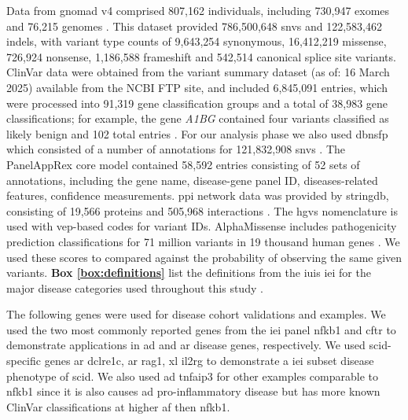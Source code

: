 Data from \ac{gnomad} v4 comprised 807,162 individuals, including 730,947 exomes and 76,215 genomes \cite{karczewski2020mutational}. This dataset provided 786,500,648 \ac{snv}s and 122,583,462 \ac{indel}s, with variant type counts of 9,643,254 synonymous, 16,412,219 missense, 726,924 nonsense, 1,186,588 frameshift and 542,514 canonical splice site variants. ClinVar data were obtained from the variant summary dataset (as of: 16 March 2025) available from the NCBI FTP site, and included 6,845,091 entries, which were processed into 91,319 gene classification groups and a total of 38,983 gene classifications; for example, the gene \textit{A1BG} contained four variants classified as likely benign and 102 total entries \cite{landrum_clinvar_2018}. For our analysis phase we also used \ac{dbnsfp} which consisted of a number of annotations for 121,832,908 \ac{snv}s 
\cite{liu_dbnsfp_2020}. 
The PanelAppRex core model contained 58,592 entries consisting of 52 sets of annotations, including the gene name, disease-gene panel ID, diseases-related features, confidence measurements.
\cite{lawless_panelapprex_2025}
\ac{ppi} network data was provided by \ac{stringdb}, consisting of 19,566 proteins and 505,968 interactions \cite{szklarczyk2025string}.
The \ac{hgvs} nomenclature is used with \ac{vep}-based codes for variant IDs.
AlphaMissense includes pathogenicity prediction classifications for 71 million variants in 19 thousand human genes \cite{cheng_accurate_2023, jun_cheng_2023_8208688}. We used these scores to compared against the probability of observing the same given variants.
\textbf{Box \ref{box:definitions}} list the definitions from the \ac{iuis} \ac{iei} for the major disease categories used throughout this study \cite{poli_human_2025}.

The following genes were used for disease cohort validations and examples.
We used the two most commonly reported genes from the \ac{iei} panel \ac{nfkb1} 
\cite{tuijnenburgNFKB12018,
who1997primary,
cunningham1999common,
oksenhendler2008infections}
and \ac{cftr} 
\cite{naito2023uk, castellani2013cftr2, Grasemann2023cftr}
to demonstrate applications in \ac{ad} and \ac{ar} disease genes, respectively.
We used \ac{scid}-specific genes 
\ac{ar} \ac{dclre1c},
\ac{ar} \ac{rag1},
\ac{xl} \ac{il2rg} to demonstrate a \ac{iei} subset disease phenotype of 
\ac{scid}.
We also used \ac{ad} \ac{tnfaip3} for other examples comparable to \ac{nfkb1} since it is also causes \ac{ad} pro-inflammatory disease but has more known ClinVar classifications at higher \ac{af} then \ac{nfkb1}.




